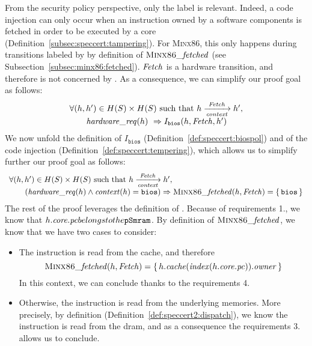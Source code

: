 From the security policy perspective, only the  label is relevant.
%
Indeed, a code injection can only occur when an instruction owned by a software
components is fetched in order to be executed by a core
(Definition~\ref{subsec:speccert:tampering}).
%
For {\scshape Minx86}, this only happens during transitions labeled by
 by definition of \( \textsc{Minx86}\mathit{\_fetched} \) (see
Subsection~\ref{subsec:minx86:fetched}).
%
\( \mathit{Fetch} \) is a hardware transition, and therefore is not concerned by
.
%
As a consequence, we can simplify our proof goal as follows:
%
\[
  \begin{array}{l}
    \forall (h, h') \in H(S) \times H(S) \text{ such that } h
    \xrightarrow[\mathit{context}]{\mathit{Fetch}} h', \\
    \qquad \mathit{hardware\_req}(h)\ \Rightarrow I_{\mathtt{bios}}(h, \mathit{Fetch}, h')
  \end{array}
\]
%
We now unfold the definition of \( I_{\mathtt{bios}} \)
(Definition~\ref{def:speccert:biospol}) and of the code injection
(Definition~\ref{def:speccert:tempering}), which allows us to simplify further
our proof goal as follows:
%
\[
  \begin{array}{l}
    \forall (h, h') \in H(S) \times H(S) \text{ such that } h
    \xrightarrow[\mathit{context}]{\mathit{Fetch}} h', \\
    \qquad (\mathit{hardware\_req}(h) \wedge \mathit{context}(h) = \mathtt{bios})
    \Rightarrow \textsc{Minx86}\mathit{\_fetched}(h, \mathit{Fetch}) =
    \{\,\mathtt{bios}\,\}
  \end{array}
\]
%
The rest of the proof leverages the definition of .
%
Because of requirements 1., we know that
\( h.\mathit{core}.\mathit{pc} belongs to the \texttt{pSmram} \).
%
By definition of \( \textsc{Minx86}\mathit{\_fetched} \), we know that we have two
cases to consider:
%
\begin{itemize}
\item The instruction is read from the cache, and therefore
  \[
    \textsc{Minx86}\mathit{\_fetched}(h, \mathit{Fetch}) =
    \{\,h.\mathit{cache}(\mathit{index}(h.\mathit{core}.\mathit{pc})).\mathit{owner}\,\}
  \]
  In this context, we can conclude thanks to the requirements 4.
\item Otherwise, the instruction is read from the underlying memories.
  More precisely, by definition 
  (Definition~\ref{def:speccert2:dispatch}), we know the instruction is read
  from the \ac{dram}, and as a consequence the requirements 3. allows us to
  conclude.
\end{itemize}

